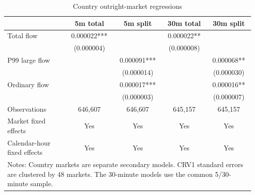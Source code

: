 \begin{table}[htbp]
\centering
\caption{Country outright-market regressions}
\label{tab:country}
\small
\begin{tabular}{lcccc}
\hline
 & 5m total & 5m split & 30m total & 30m split \\
\hline
Total flow & 0.000022*** &  & 0.000022** &  \\
 & (0.000004) &  & (0.000008) &  \\
P99 large flow &  & 0.000091*** &  & 0.000068** \\
 &  & (0.000014) &  & (0.000030) \\
Ordinary flow &  & 0.000017*** &  & 0.000016** \\
 &  & (0.000003) &  & (0.000007) \\
\hline
Observations & 646,607 & 646,607 & 645,157 & 645,157 \\
Market fixed effects & Yes & Yes & Yes & Yes \\
Calendar-hour fixed effects & Yes & Yes & Yes & Yes \\
\hline
\multicolumn{5}{p{0.94\textwidth}}{\footnotesize Notes: Country markets are separate secondary models. CRV1 standard errors are clustered by 48 markets. The 30-minute models use the common 5/30-minute sample.}
\end{tabular}
\end{table}
